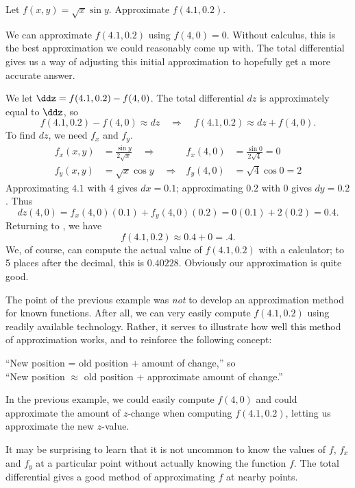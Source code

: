 {Let $f(x,y)=\sqrt{x}\sin y$. Approximate $f(4.1,0.2)$.}
{We can approximate $f(4.1,0.2)$ using $f(4,0)=0$. Without calculus, this is the best approximation we could reasonably come up with. The total differential gives us a way of adjusting this initial approximation to hopefully get a more accurate answer.

We let $\ddz = f(4.1,0.2) - f(4,0)$. The total differential $dz$ is approximately equal to $\ddz$, so
\begin{equation}
f(4.1,0.2) - f(4,0) \approx dz
\quad \Rightarrow \quad
f(4.1,0.2) \approx dz + f(4,0).\label{eq:totaldiff2}
\end{equation}
To find $dz$, we need $f_x$ and $f_y$.
\begin{align*}
f_x(x,y) &= \frac{\sin y}{2\sqrt{x}} \quad\Rightarrow&
f_x(4,0) &= \frac{\sin0}{2\sqrt{4}}=0 \\
f_y(x,y) &= \sqrt{x}\cos y \quad\Rightarrow&
f_y(4,0) &= \sqrt{4}\cos0=2
\end{align*}
Approximating $4.1$ with 4 gives $dx = 0.1$; approximating $0.2$ with $0$ gives $dy=0.2$. Thus
\[
dz(4,0) = f_x(4,0)(0.1) + f_y(4,0)(0.2)
=0(0.1) + 2(0.2)
=0.4.
\]
Returning to , we have
\[f(4.1,0.2) \approx 0.4 + 0 = .4.\]
We, of course, can compute the actual value of $f(4.1,0.2)$ with a calculator; to 5 places after the decimal, this is $0.40228$. Obviously our approximation is quite good.}

The point of the previous example was \textit{not} to develop an approximation method for known functions. After all, we can very easily compute $f(4.1,0.2)$ using readily available technology. Rather, it serves to illustrate how well this method of approximation works, and to reinforce the following concept:
\begin{center}
	``New position = old position $+$ amount of change,'' so\\
	``New position $\approx$ old position + approximate amount of change.''
\end{center}

In the previous example, we could easily compute $f(4,0)$ and could approximate the amount of $z$-change when computing $f(4.1,0.2)$, letting us approximate the new $z$-value.

It may be surprising to learn that it is not uncommon to know the values of $f$, $f_x$ and $f_y$ at a particular point without actually knowing the function $f$. The total differential gives a good method of approximating $f$ at nearby points.


